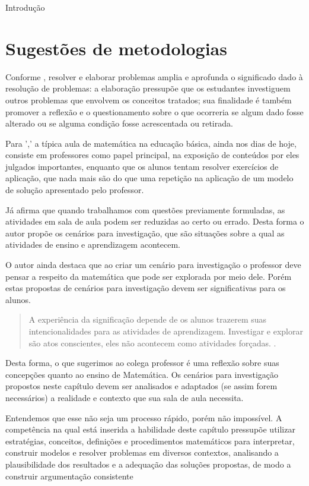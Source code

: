 \begin{apresentacao}{Introdução}
  \section{Sugestões de metodologias}

  Conforme \citet{BNCC2019}, resolver e elaborar problemas amplia e aprofunda o significado dado à resolução de problemas: a elaboração pressupõe que os estudantes investiguem outros problemas que envolvem os conceitos tratados; sua finalidade é também promover a reflexão e o questionamento sobre o que ocorreria se algum dado fosse alterado ou se alguma condição fosse acrescentada ou retirada.

  Para \citet{dambrosio1989}',' a típica aula de matemática na educação básica, ainda nos dias de hoje, consiste em professores como papel principal, na exposição de conteúdos por eles julgados importantes, enquanto que os alunos tentam resolver exercícios de aplicação, que nada mais são do que uma repetição na aplicação de um modelo de solução apresentado pelo professor.

  Já \citet{skovsmose2014} afirma que quando trabalhamos com questões previamente formuladas, as atividades em sala de aula podem ser reduzidas ao certo ou errado. Desta forma o autor propõe os cenários para investigação, que são situações sobre a qual as atividades de ensino e aprendizagem acontecem.

  O autor ainda destaca que ao criar um cenário para investigação o professor deve pensar a respeito da matemática que pode ser explorada por meio dele. Porém estas propostas de cenários para investigação devem ser significativas para os alunos.
  \columnbreak
  \begin{quote}
  A experiência da significação depende de os alunos trazerem suas intencionalidades para as atividades de aprendizagem. Investigar e explorar são atos conscientes, eles não acontecem como atividades forçadas. \citep[p. 60]{skovsmose2014}.
  \end{quote}
  Desta forma, o que sugerimos ao colega professor é uma reflexão sobre suas concepções quanto ao ensino de Matemática. Os cenários para investigação propostos neste capítulo devem ser analisados e adaptados (se assim forem necessários) a realidade e contexto que sua sala de aula necessita.

  Entendemos que esse não seja um processo rápido, porém não impossível. A competência na qual está inserida a habilidade deste capítulo pressupõe utilizar estratégias, conceitos, definições e procedimentos matemáticos para interpretar, construir modelos e resolver problemas em diversos contextos, analisando a plausibilidade dos resultados e a adequação das soluções propostas, de modo a construir argumentação consistente \citep[p. 535]{BNCC2019}


\end{apresentacao}
